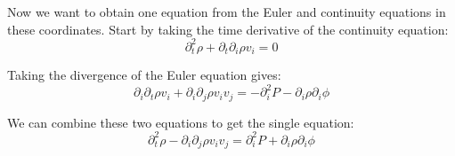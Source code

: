 \documentclass{article}
\begin{document}


Now we want to obtain one equation from the Euler and continuity equations in these coordinates.  Start by taking the time derivative of the continuity equation:
\begin{equation}
  \partial_t^2 \rho + \partial_t \partial_i \rho v_i = 0 
\end{equation}

Taking the divergence of the Euler equation gives:
\begin{equation}
  \partial_i \partial_t \rho v_i + \partial_i \partial_j  \rho v_i v_j
      = - \partial_i^2 P - \partial_i \rho \partial_i \phi 
\end{equation}

We can combine these two equations to get the single equation:
\begin{equation} 
  \partial_t^2 \rho - \partial_i \partial_j \rho v_i v_j =  \partial_i^2 P + \partial_i \rho \partial_i \phi
\end{equation}
\end{document}
